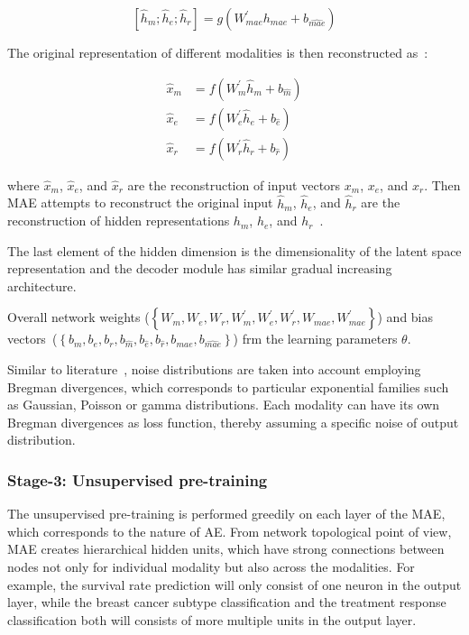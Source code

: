 \begin{equation}
    \left[\hat{h}_{m}; \hat{h}_{e}; \hat{h}_{r}
    \right]=g\left(W_{mae}^{\prime} h_{mae}+b_{\hat{mae}}\right)
\end{equation}

The original representation of different modalities is then reconstructed as~\cite{wang2018associativemulti}: 

\begin{equation}
    \begin{aligned}
        \hat{x}_{m} &=f\left(W_{m}^{\prime} \hat{h}_{m}+b_{\hat{m}}\right) \\
        \hat{x}_{e} &=f\left(W_{e}^{\prime} \hat{h}_{e}+b_{\hat{e}}\right) \\
        \hat{x}_{r} &=f\left(W_{r}^{\prime} \hat{h}_{r}+b_{\hat{r}}\right)
        \end{aligned}
\end{equation}

\hspace*{3.5mm} where $\hat{x}_{m}$, $\hat{x}_{e}$, and $\hat{x}_{r}$ are the reconstruction of input vectors $x_{m}$, $x_{e}$, and $x_{r}$. Then MAE attempts to reconstruct the original input $\hat{h}_{m}$, $\hat{h}_{e}$, and $\hat{h}_{r}$ are the reconstruction of hidden representations ${h}_{m}$, ${h}_{e}$, and ${h}_{r}$~\cite{wang2018associativemulti}. 

The last element of the hidden dimension is the dimensionality of the latent space representation and the decoder module has similar gradual increasing architecture. 


Overall network weights ($\left\{W_{m},W_{e},W_{r},W_{m}^{\prime},W_{e}^{\prime},W_{r}^{\prime},W_{mae},W_{mae}^{\prime}\right\}$) and bias vectors~($\left\{b_{m}, b_{e}, b_{r}, b_{\hat{m}}, b_{\hat{e}}, b_{\hat{r}}, b_{mae}, b_{\hat{mae}}\right\}$) frm the learning parameters $\theta$.

\hspace*{3.5mm} Similar to literature~\cite{wang2018associativemulti,serban2016multi}, noise distributions are taken into account employing Bregman divergences, which corresponds to particular exponential families such as Gaussian, Poisson or gamma distributions. Each modality can have its own Bregman divergences as loss function, thereby assuming a specific noise of output distribution. 

\subsubsection{Stage-3: Unsupervised pre-training}
The unsupervised pre-training is performed greedily on each layer of the MAE, which corresponds to the nature of AE. From network topological point of view, MAE creates hierarchical hidden units, which have strong connections between nodes not only for individual modality but also across the modalities. For example, the survival rate prediction will only consist of one neuron in the output layer, while the breast cancer subtype classification and the treatment response classification both will consists of more multiple units in the output layer. 

